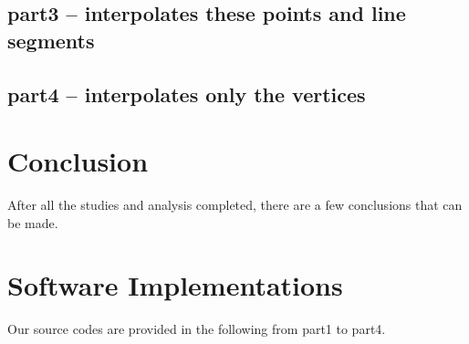 \documentclass{article}
\begin{document}
\subsection{part3 -- interpolates these points and line segments}



\subsection{part4 -- interpolates only the vertices }



\section{Conclusion}
After all the studies and analysis completed, there are a few conclusions that can be made. 




\newpage
\section{Software Implementations}

Our source codes are provided in the following from part1 to part4. 
\end{document}
